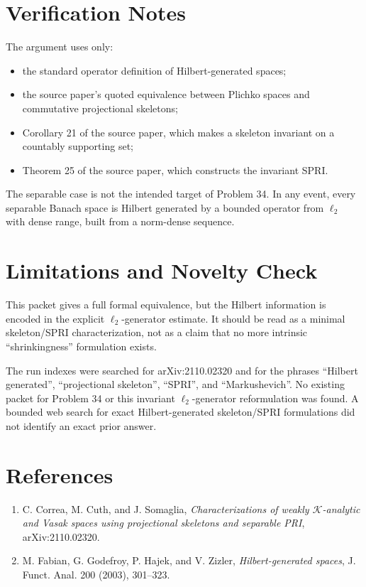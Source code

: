 \documentclass[11pt]{article}
\begin{document}
\section*{Verification Notes}

The argument uses only:
\begin{itemize}
\item the standard operator definition of Hilbert-generated spaces;
\item the source paper's quoted equivalence between Plichko spaces and
  commutative projectional skeletons;
\item Corollary 21 of the source paper, which makes a skeleton invariant on a
  countably supporting set;
\item Theorem 25 of the source paper, which constructs the invariant SPRI.
\end{itemize}

The separable case is not the intended target of Problem 34. In any event, every
separable Banach space is Hilbert generated by a bounded operator from
$\ell_2$ with dense range, built from a norm-dense sequence.

\section*{Limitations and Novelty Check}

This packet gives a full formal equivalence, but the Hilbert information is
encoded in the explicit $\ell_2$-generator estimate. It should be read as a
minimal skeleton/SPRI characterization, not as a claim that no more intrinsic
``shrinkingness'' formulation exists.

The run indexes were searched for arXiv:2110.02320 and for the phrases
``Hilbert generated'', ``projectional skeleton'', ``SPRI'', and
``Markushevich''. No existing packet for Problem 34 or this invariant
$\ell_2$-generator reformulation was found. A bounded web search for exact
Hilbert-generated skeleton/SPRI formulations did not identify an exact prior
answer.

\section*{References}

\begin{enumerate}
\item C. Correa, M. Cuth, and J. Somaglia, \emph{Characterizations of weakly
$\mathcal K$-analytic and Vasak spaces using projectional skeletons and
separable PRI}, arXiv:2110.02320.
\item M. Fabian, G. Godefroy, P. Hajek, and V. Zizler,
\emph{Hilbert-generated spaces}, J. Funct. Anal. 200 (2003), 301--323.
\end{enumerate}
\end{document}
